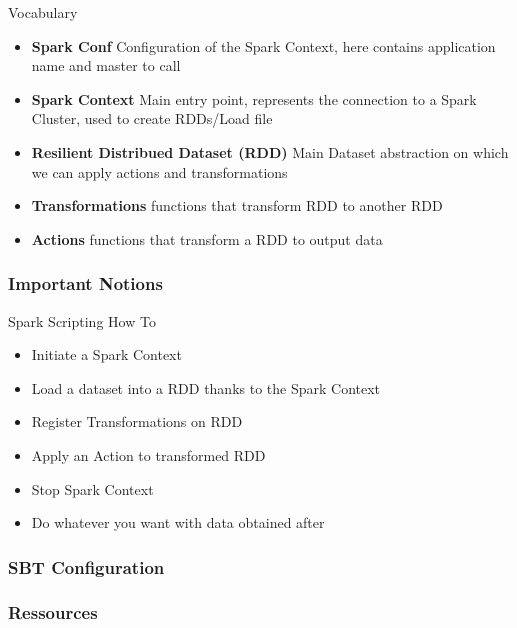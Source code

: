 \documentclass[slidetop,9pt,utf8]{beamer}
\begin{document}
\begin{CJK}{UTF8}{gbsn}
\begin{frame}
  \begin{block}{Vocabulary}
    \begin{itemize}
      \item \textbf{Spark Conf} Configuration of the Spark Context, here contains application name and master to call
      \item \textbf{Spark Context} Main entry point, represents the connection to a Spark Cluster, used to create RDDs/Load file
      \item \textbf{Resilient Distribued Dataset (RDD)} Main Dataset abstraction on which we can apply actions and transformations
      \item \textbf{Transformations} functions that transform RDD to another RDD
      \item \textbf{Actions} functions that transform a RDD to output data
    \end{itemize}
  \end{block}

\end{frame}

\begin{frame}
  \frametitle{Important Notions}

  \begin{block}{Spark Scripting How To}
    \begin{itemize}
      \item Initiate a Spark Context
      \item Load a dataset into a RDD thanks to the Spark Context
      \item Register Transformations on RDD
      \item Apply an Action to transformed RDD
      \item Stop Spark Context
      \item Do whatever you want with data obtained after 
    \end{itemize}
  \end{block}

\end{frame}

\begin{frame}
  \frametitle{SBT Configuration}

  

\end{frame}

\begin{frame}
  \frametitle{Ressources}


\end{frame}
\end{CJK}
\end{document}
